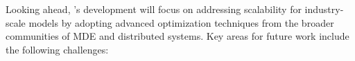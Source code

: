 Looking ahead, \jjodel{}’s development will focus on addressing scalability for industry-scale models by adopting advanced optimization techniques from the broader communities of MDE and distributed systems. Key areas for future work include the following challenges:
